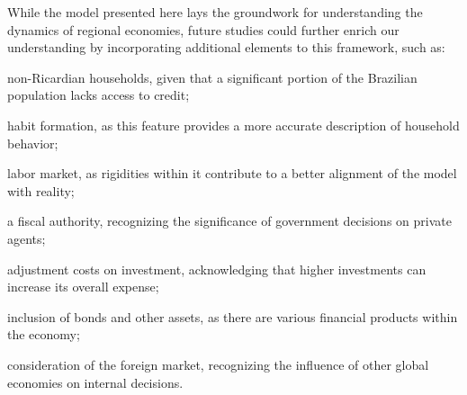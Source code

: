 \documentclass[../thesis.tex]{subfiles}
\begin{document}
While the model presented here lays the groundwork for understanding the dynamics of regional economies, future studies could further enrich our understanding by incorporating additional elements to this framework, such as: %
\begin{enumerate*}[label=(\arabic*)]
	\item non-Ricardian households, given that a significant portion of the Brazilian population lacks access to credit; 
	\item habit formation, as this feature provides a more accurate description of household behavior;
	\item labor market, as rigidities within it contribute to a better alignment of the model with reality;
	\item a fiscal authority, recognizing the significance of government decisions on private agents;
	\item adjustment costs on investment, acknowledging that higher investments can increase its overall expense;
	\item inclusion of bonds and other assets, as there are various financial products within the economy;
	\item consideration of the foreign market, recognizing the influence of other global economies on internal decisions.
\end{enumerate*} 


\end{document}
